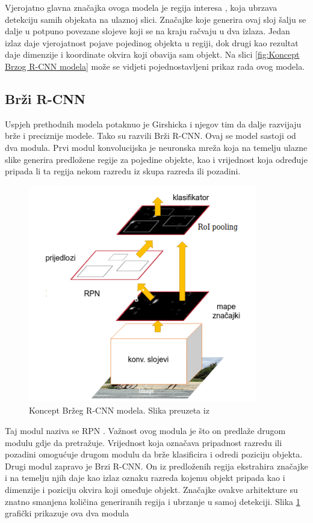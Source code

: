 Vjerojatno glavna značajka ovoga modela je regija interesa , koja ubrzava
detekciju samih objekata na ulaznoj slici. 
Značajke koje generira ovaj sloj šalju se dalje u potpuno povezane slojeve  koji 
se na kraju račvaju u dva izlaza. Jedan izlaz daje vjerojatnost pojave pojedinog objekta u regiji, dok 
drugi kao rezultat daje dimenzije i koordinate okvira koji obavija sam objekt. Na slici \ref{fig:Koncept Brzog R-CNN modela} može se
vidjeti pojednostavljeni prikaz rada ovog modela. \cite{DBLP:journals/corr/Girshick15}


\subsection{Brži R-CNN}
Uspjeh prethodnih modela potaknuo je Girshicka i njegov tim da dalje razvijaju brže i preciznije modele.
Tako su razvili Brži R-CNN. Ovaj se model sastoji od dva modula.\newline
Prvi modul konvolucijska je neuronska mreža koja na temelju ulazne slike generira predložene regije za pojedine objekte, kao i vrijednost koja određuje pripada li ta regija
nekom razredu iz skupa razreda ili pozadini.

\begin{figure}[htb]
    \centering
    \includegraphics[width=10cm]{img/Faster-RCNN.png}
    \caption{Koncept Bržeg R-CNN modela. Slika preuzeta iz \citep{DBLP:journals/corr/RenHG015}}
    \label{fig:Koncept Bržeg R-CNN modela}
\end{figure}

Taj modul naziva se RPN . Važnost ovog modula je što on predlaže drugom modulu gdje da pretražuje. Vrijednost koja označava pripadnost razredu ili pozadini 
omogućuje drugom modulu da brže klasificira i odredi poziciju objekta. 
Drugi modul zapravo je Brzi R-CNN. On iz predloženih regija ekstrahira značajke i na temelju njih daje kao izlaz oznaku razreda kojemu objekt pripada kao i dimenzije i poziciju okvira koji
omeđuje objekt.\newline
Značajke ovakve arhitekture su znatno smanjena količina generiranih regija i ubrzanje u samoj detekciji. Slika \ref{fig:Koncept Bržeg R-CNN modela} grafički prikazuje
ova dva modula \citep{DBLP:journals/corr/RenHG015}


